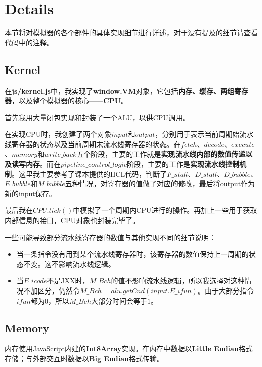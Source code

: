 
\section{Details}

本节将对模拟器的各个部件的具体实现细节进行详述，对于没有提及的细节请查看代码中的注释。

\subsection{Kernel}

在{\bf js/kernel.js}中，我实现了{\bf window.VM}对象，它包括{\bf 内存、缓存、两组寄存器}，以及整个模拟器的核心——{\bf CPU}。

首先我用大量闭包实现和封装了一个ALU，以供CPU调用。

在实现CPU时，我创建了两个对象$input$和$output$，分别用于表示当前周期始流水线寄存器的状态以及当前周期末流水线寄存器的状态。在$fetch$、$decode$、$execute$、$memory$和$write\_back$五个阶段，主要的工作就是{\bf 实现流水线内部的数值传递以及读写内存}。而在$pipeline\_control\_logic$阶段，主要的工作是{\bf 实现流水线控制机制}。这里我主要参考了课本提供的HCL代码，判断了$F\_stall$、$D\_stall$、$D\_bubble$、$E\_bubble$和$M\_bubble$五种情况，对寄存器的值做了对应的修改，最后将output作为新的input保存。

最后我在$CPU.tick()$中模拟了一个周期内CPU进行的操作。再加上一些用于获取内部信息的接口，CPU对象也封装完毕了。

一些可能导致部分流水线寄存器的数值与其他实现不同的细节说明：
\begin{itemize}
\item 当一条指令没有用到某个流水线寄存器时，该寄存器的数值保持上一周期的状态不变。这不影响流水线逻辑。
\item 当$E\_icode$不是JXX时，$M\_Bch$的值不影响流水线逻辑，所以我选择对这种情况不加区分，仍然令$M\_Bch = alu.getCnd(input.E\_ifun)$。由于大部分指令$ifun$都为$0$，所以$M\_Bch$大部分时间会等于$1$。
\end{itemize}

\subsection{Memory}

内存使用JavaScript内建的{\bf Int8Array}实现。在内存中数据以{\bf Little Endian}格式存储；与外部交互时数据以{\bf Big Endian}格式传输。

